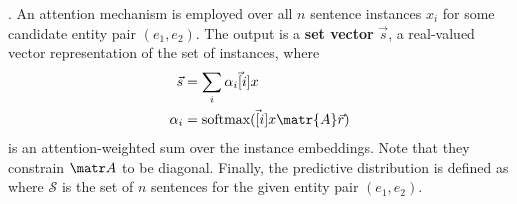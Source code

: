 \documentclass[11pt]{article}
\begin{document}
\myspace
\p {}. An attention mechanism is employed over all $n$ sentence instances $x_i$ for some candidate entity pair $(e_1, e_2)$. The output is a \textbf{set vector} $\vec s$, a real-valued vector representation of the set of instances, where
\begin{align}
\vec s &= \sum_i \alpha_i \vec[i]{x} \\
\alpha_i &= \text{softmax}(\vec[i]{x} \matr{A} \vec{r})
\end{align}
is an attention-weighted sum over the instance embeddings. Note that they constrain $\matr A$ to be diagonal. Finally, the predictive distribution is defined as
where $\mathcal{S}$ is the set of $n$ sentences for the given entity pair $(e_1, e_2)$. 
























































\label{Language Modeling}
\end{document}
